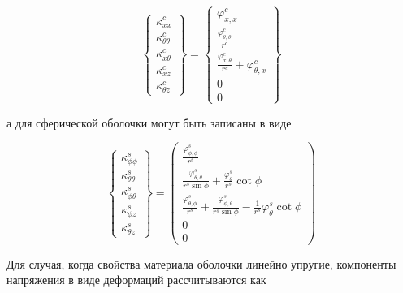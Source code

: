 \begin{equation}
	\label{eq:vibro1:7}
	\begin{Bmatrix}
		\kappa_{xx}^{c} \\
		\kappa_{\theta \theta}^{c} \\
		\kappa_{x \theta}^{c} \\
		\kappa_{x z}^{c} \\
		\kappa_{\theta z}^{c}
	\end{Bmatrix} =
	\begin{Bmatrix}
		\varphi_{x,x}^c \\
		\frac{\varphi_{\theta, \theta}^c}{r^c} \\
		\frac{\varphi_{x, \theta}^c}{r^c}+\varphi_{\theta, x}^c \\
		0 \\
		0
	\end{Bmatrix}
\end{equation}

а для сферической оболочки могут быть записаны в виде

\begin{equation}
	\label{eq:vibro1:8}
	\begin{Bmatrix}
		\kappa_{\phi\phi}^{s} \\
		\kappa_{\theta \theta}^{s} \\
		\kappa_{\phi \theta}^{s} \\
		\kappa_{\phi z}^{s} \\
		\kappa_{\theta z}^{s}
	\end{Bmatrix} =
	\begin{pmatrix}
		\frac{\varphi_{\phi,\phi}^s}{r^s} \\
		\frac{\varphi_{\theta, \theta}^s}{r^s \sin{\phi}} + \frac{\varphi_{\theta}^s}{r^s}\cot{\phi} \\
		\frac{\varphi_{\theta, \phi}^s}{r^s}+\frac{\varphi_{\phi, \theta}^s}{r^s \sin{\phi}}-\frac{1}{r^s}\varphi_{\theta}^s \cot{\phi} \\
		0 \\
		0
	\end{pmatrix}
\end{equation}


Для случая, когда свойства материала оболочки линейно упругие, компоненты напряжения в виде деформаций рассчитываются как 


